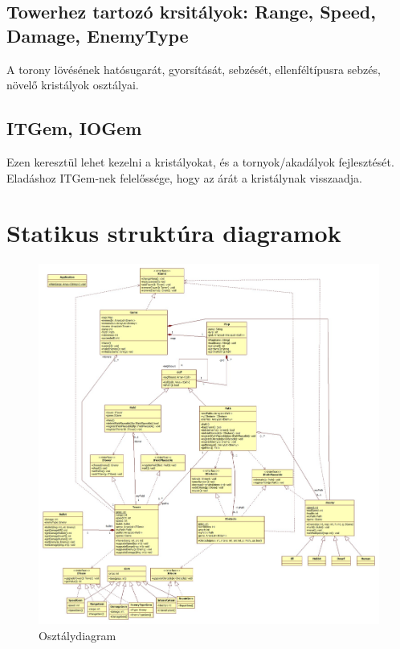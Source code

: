 \subsection{Towerhez tartozó krsitályok: Range, Speed, Damage, EnemyType}
A torony lövésének hatósugarát, gyorsítását, sebzését, ellenféltípusra sebzés, növelő kristályok osztályai.

\subsection{ITGem, IOGem}
Ezen keresztül lehet kezelni a kristályokat, és a tornyok/akadályok fejlesztését. Eladáshoz ITGem-nek felelőssége, hogy az árát a kristálynak visszaadja.




\section{Statikus struktúra diagramok}

\begin{figure}[H]
\begin{center}
\includegraphics[width=17cm]{chapters/chapter04/images/Main.jpg}
\caption{Osztálydiagram}
\label{fig:Osztálydiagram}
\end{center}
\end{figure}


